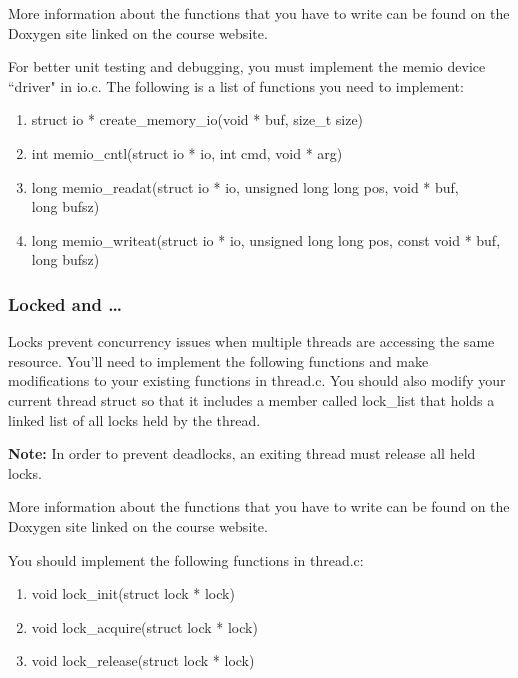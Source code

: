 \documentclass{article}
\begin{document}
	More information about the functions that you have to write can be found on the Doxygen site linked on the course website.

	For better unit testing and debugging, you must implement the {\fix memio} device ``driver" in {\fix io.c}. The following is a list of functions you need to implement:

	\begin{enumerate}
	\item {\fix struct io * create\_memory\_io(void * buf, size\_t size)}

	\item {\fix int memio\_cntl(struct io * io, int cmd, void * arg)}

	\item {\fix long memio\_readat(struct io * io, unsigned long long pos, void * buf, \\
	long bufsz)} 

	\item {\fix long memio\_writeat(struct io * io, unsigned long long pos, const void * buf, long bufsz)}

	\end{enumerate}
	
	\subsubsection{Locked and \ldots}

    Locks prevent concurrency issues when multiple threads are accessing the same resource. 
    You'll need to implement the following functions and make modifications to your existing 
    functions in {\fix thread.c}. You should also modify your current thread struct so that 
    it includes a member called {\fix lock\_list} that holds a linked list of all locks held by the thread.
	
	\textbf{Note:} In order to prevent deadlocks, an exiting thread must release all held locks.

	More information about the functions that you have to write can be found on the Doxygen site linked on the course website.

	You should implement the following functions in {\fix thread.c}:
	
    \begin{enumerate}

       \item{\fix void lock\_init(struct lock * lock)}

       \item{\fix void lock\_acquire(struct lock * lock)}

        \item{\fix void lock\_release(struct lock * lock)}

	\end{enumerate}
\end{document}
